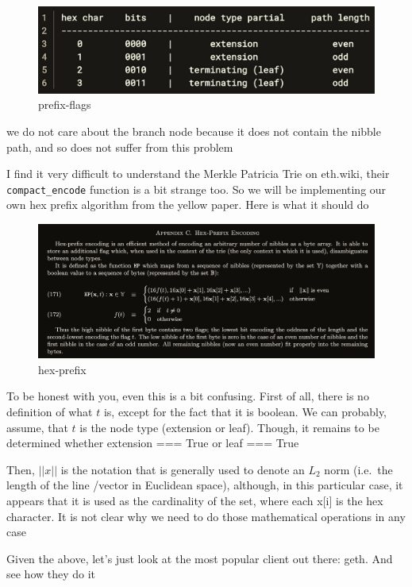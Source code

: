 \documentclass[11pt]{article}
\begin{document}
    \begin{figure}
\centering
\includegraphics{../static/prefix-flags.png}
\caption{prefix-flags}
\end{figure}

    we do not care about the branch node because it does not contain the
nibble path, and so does not suffer from this problem

    I find it very difficult to understand the Merkle Patricia Trie on
eth.wiki, their \texttt{compact\_encode} function is a bit strange too.
So we will be implementing our own hex prefix algorithm from the yellow
paper. Here is what it should do

    \begin{figure}
\centering
\includegraphics{../static/hex-prefix.png}
\caption{hex-prefix}
\end{figure}

    To be honest with you, even this is a bit confusing. First of all, there
is no definition of what \(t\) is, except for the fact that it is
boolean. We can probably, assume, that \(t\) is the node type (extension
or leaf). Though, it remains to be determined whether extension === True
or leaf === True

Then, \(||x||\) is the notation that is generally used to denote an
\(L_2\) norm (i.e.~the length of the line /vector in Euclidean space),
although, in this particular case, it appears that it is used as the
cardinality of the set, where each x{[}i{]} is the hex character. It is
not clear why we need to do those mathematical operations in any case

    Given the above, let's just look at the most popular client out there:
geth. And see how they do it
\end{document}
